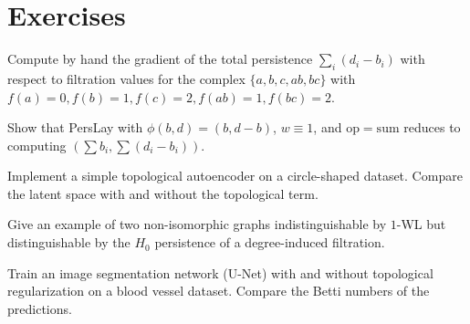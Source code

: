 \section{Exercises}

\begin{exercise}
Compute by hand the gradient of the total persistence
$\sum_i (d_i - b_i)$ with respect to filtration values for the
complex $\{a, b, c, ab, bc\}$ with $f(a) = 0, f(b) = 1, f(c) = 2,
f(ab) = 1, f(bc) = 2$.
\end{exercise}

\begin{exercise}
Show that PersLay with $\phi(b, d) = (b, d-b)$, $w \equiv 1$, and
$\mathrm{op} = \mathrm{sum}$ reduces to computing
$(\sum b_i, \sum(d_i - b_i))$.
\end{exercise}

\begin{exercise}[Implementation]
Implement a simple topological autoencoder on a circle-shaped dataset.
Compare the latent space with and without the topological term.
\end{exercise}

\begin{exercise}
Give an example of two non-isomorphic graphs indistinguishable by
$1$-WL but distinguishable by the $H_0$ persistence of a
degree-induced filtration.
\end{exercise}

\begin{exercise}[Project]
Train an image segmentation network (U-Net) with and without
topological regularization on a blood vessel dataset. Compare the
Betti numbers of the predictions.
\end{exercise}
